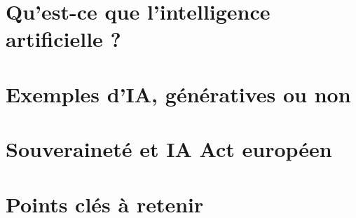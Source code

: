\localized

\begin{bibliographysection}

\part[subtitle={Concepts et modèles dans les applications modernes}]{Qu'est-ce que l'intelligence artificielle ?}
\localized
\localized
\localized
\localized

\part{Exemples d'IA, génératives ou non}
\localized
\localized
\localized
\localized
\localized

\part[subtitle={Le point de vue d'un technologue}]{Souveraineté et IA Act européen}
\localized

\part{Points clés à retenir}
\localized
\localized


\end{bibliographysection}

\endinput
